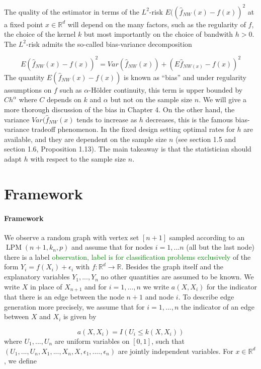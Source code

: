 \documentclass{article}
\newcommand\SB[1]{\textcolor{green}{#1}}
\DeclareMathOperator{\LPM}{LPM}
\begin{document}
The quality of the estimator in terms of the $L^2$-risk
$E((\hat{f}_{NW}(x)-f(x))^2$ at a fixed point $x\in\mathbb{R}^d$ will depend on
the many factors, such as the regularity of $f$, the choice of the kernel $k$
but most importantly on the choice of bandwith $h>0$. The $L^2$-risk admits the so-called bias-variance decomposition

\begin{equation}
\label{eqn:bias-variance-decomp}
E(\hat{f}_{NW}(x)-f(x))^2=Var(\hat{f}_{NW}(x))+(E\hat{f}_{NW(x)}-f(x))^2
\end{equation}
The quantity $E(\hat{f}_{NW}(x)-f(x))$ is known as ``bias'' and under regularity assumptions on $f$ such as $\alpha$-Hölder continuity, this term is upper bounded by $Ch^{\alpha}$ where $C$ depends on $k$ and $\alpha$ but not on the sample size $n$. We will give a more thorough discussion of the bias in Chapter 4. On the other hand, the variance $Var(\hat{f}_{NW}(x)$ tends to increase as $h$ decreases, this is the famous bias-variance tradeoff phenomenon. In the fixed design setting optimal rates for $h$ are available, and they are dependent on the sample size $n$ (see \cite{Tsybakov} section 1.5 and section 1.6, Proposition 1.13). The main takeaway is that the statistician should adapt $h$ with respect to the sample size $n$. 


 \section{Framework}
\paragraph{Framework} We observe a random graph with vertex set $[n+1]$  sampled
according to an $\LPM(n+1,k_n,p)$ and assume that for nodes $i=1,...n$ (all but
the last node) there is a label \SB{observation, label is for classification
  problems exclusively} of the form $Y_i=f(X_i)+\epsilon_i$ with $f\colon\mathbb{R}^d\to\mathbb{R}$. Besides the graph itself and the explanatory variables $Y_1,...,Y_n$ no other quantities are assumed to be known. We write $X$ in place of $X_{n+1}$ and for $i=1,...,n$ we write $a(X,X_i)$ for the indicator that there is an edge between the node $n+1$ and node $i$. To describe edge generation more precisely, we assume that for $i=1,...,n$ the indicator of an edge between $X$ and $X_{i}$ is given by 

\begin{equation*}
    a(X,X_{i})=I(U_i\leq k(X,X_i))
\end{equation*}
where $U_1,...,U_n$ are uniform variables on $[0,1]$, such that $(U_1,...,U_n,X_1,...,X_n,X,\epsilon_1,....,\epsilon_n)$ are jointly independent variables. For $x\in\mathbb{R}^d$, we define
\end{document}
